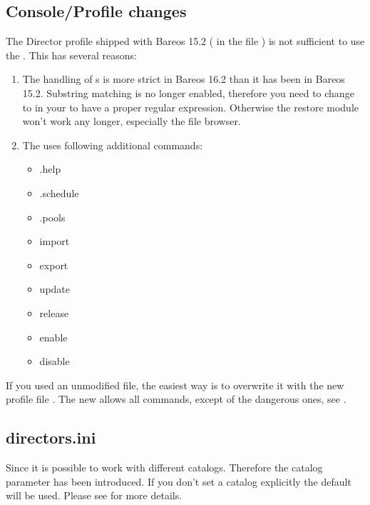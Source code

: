 \subsection{Console/Profile changes}

The \bareosWebui Director profile shipped with Bareos 15.2 ( in the file ) is not sufficient to use the .
This has several reasons:
\begin{enumerate}
  \item The handling of s is more strict in Bareos 16.2 than it has been in Bareos 15.2.
    Substring matching is no longer enabled, therefore you need to change  to 
    in your  to have a proper regular expression.
    Otherwise the restore module won't work any longer, especially the file browser.

  \item The  uses following additional commands:
\begin{itemize}
\item .help
\item .schedule
\item .pools
\item import
\item export
\item update
\item release
\item enable
\item disable
\end{itemize}

\end{enumerate}

If you used an unmodified  file,
the easiest way is to overwrite it with the new profile file .
The new  allows all commands, except of the dangerous ones, see .

\subsection{directors.ini}

Since  it is possible to work with different catalogs. Therefore the catalog parameter has been introduced. If you don't set a catalog explicitly the default  will be used. Please see  for more details.

